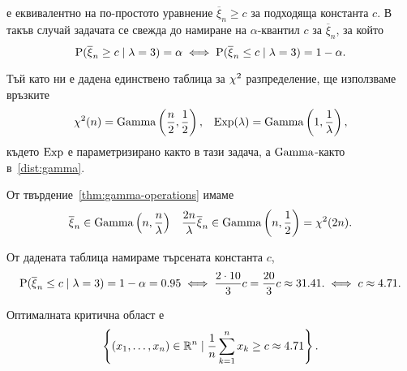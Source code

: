 \documentclass[numbers=endperiod, DIV=15, bibliography=totocnumbered]{scrartcl}
\begin{document}
\begin{solution}
\begin{enumerate}[label=\alph*)]
    е еквивалентно на по-простото уравнение $\overline \xi_n \geq c$ за подходяща константа $c$. В такъв случай задачата се свежда до намиране на $\alpha$-квантил $c$ за $\overline \xi_n$, за който
    \begin{displaymath}
      \operatorname{P}(\overline \xi_n \geq c \mid \lambda = 3) = \alpha
      \iff
      \operatorname{P}(\overline \xi_n \leq c \mid \lambda = 3) = 1 - \alpha.
    \end{displaymath}

    Тъй като ни е дадена единствено таблица за $\operatorname{\chi^2}$ разпределение, ще използваме връзките
    \begin{align*}
      \operatorname{\chi^2}(n) = \operatorname{Gamma} \left(\frac n 2, \frac 1 2 \right),
      &&
      \operatorname{Exp}(\lambda) = \operatorname{Gamma}\left(1, \frac 1 \lambda \right),
    \end{align*}
    където $\operatorname{Exp}$ е параметризирано както в тази задача, а $\operatorname{Gamma}$-както в~\ref{dist:gamma}.

    От твърдение~\ref{thm:gamma-operations} имаме
    \begin{align*}
      \overline \xi_n \in \operatorname{Gamma}\left( n, \frac n \lambda \right)
      &&
      \frac {2n} \lambda \overline \xi_n \in \operatorname{Gamma}\left( n, \frac 1 2 \right) = \operatorname{\chi^2}(2n).
    \end{align*}

    От дадената таблица намираме търсената константа $c$,
    \begin{displaymath}
      \operatorname{P}(\overline \xi_n \leq c \mid \lambda = 3) = 1 - \alpha = 0.95
      \iff
      \frac {2 \cdot 10} 3 c = \frac {20} 3 c \approx 31.41.
      \iff
      c \approx 4.71.
    \end{displaymath}

    Оптималната критична област е
    \begin{displaymath}
      \left\{ (x_1, \ldots, x_n) \in \mathbb{R}^n \mid \frac 1 n \sum_{k=1}^n x_k \geq c \approx 4.71 \right\}.
    \end{displaymath}
  \end{enumerate}
\end{solution}

\printbibliography
\end{document}
